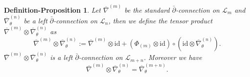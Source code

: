 \documentclass[12pt]{article}
\newtheorem{definition-proposition}[definition]{Definition-Proposition}
\numberwithin{equation}{section}
\def\id{{\text{id}}}
\def\pb{\bar{\partial}}
\def\nb{\bar{\nabla}_\theta}
\def\nb{\overline{\nabla}_\theta}
\def\L{\mathcal{L}}
\begin{document}
\begin{definition-proposition}\label{def-prop: tensor product connection}
Let $\overline{\nabla}^{(m)}$ be the standard $\pb$-connection on $\L_m$ and $\nb^{(n)}$ be a left $\pb$-connection on $\L_n$, then we define the tensor product $\overline{\nabla}^{(m)}\otimes \nb^{(n)}$ as 
\begin{equation}
    \overline{\nabla}^{(m)}\otimes \nb^{(n)}:=\overline{\nabla}^{(m)}\otimes \id+ (\Phi_{(m)}\otimes \id)\circ (\id\otimes \nb^{(n)}).
\end{equation}
$\overline{\nabla}^{(m)}\otimes \nb^{(n)}$ is a left $\pb$-connection on $\L_{m+n}$. Moreover we have
\begin{equation}\label{eq: tensor product connections equal}
\overline{\nabla}^{(m)}\otimes \nb^{(n)}=\nb^{(m+n)}.
\end{equation}
\end{definition-proposition}
\end{document}
